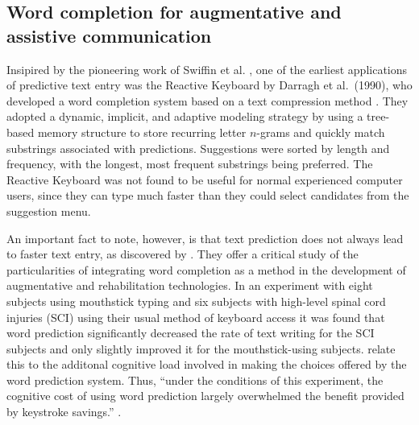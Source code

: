 \documentclass[12pt]{article}
\begin{document}

\subsection{Word completion for augmentative and assistive communication}

Insipired by the pioneering work of Swiffin et al. \citeyear{Swiffin+85}, one of the earliest applications of predictive text entry was the Reactive Keyboard by Darragh et al.~(1990), who developed a word completion system based on a text compression method \cite{Darragh+90}. They adopted a dynamic, implicit, and adaptive modeling strategy by using a tree-based memory structure to store recurring letter $n$-grams and quickly match substrings associated with predictions. Suggestions were sorted by length and frequency, with the longest, most frequent substrings being preferred. The Reactive Keyboard was not found to be useful for normal experienced computer users, since they can type much faster than they could select candidates from the suggestion menu. 

An important fact to note, however, is that text prediction does not always lead to faster text entry, as discovered by  . They offer a critical study of the particularities of integrating word completion as a method in the development of augmentative and rehabilitation technologies. In an experiment with eight subjects using mouthstick typing and six subjects with high-level spinal cord injuries (SCI) using their usual method of keyboard access it was found that word prediction significantly decreased the rate of text writing for the SCI subjects and only slightly improved it for the mouthstick-using subjects.  relate this to the additonal cognitive load involved in making the choices offered by the word prediction system. Thus, ``under the conditions of this experiment, the cognitive cost of using word prediction largely overwhelmed the benefit provided by keystroke savings.'' \cite{Horstmann-Koester+96}.
\end{document}
